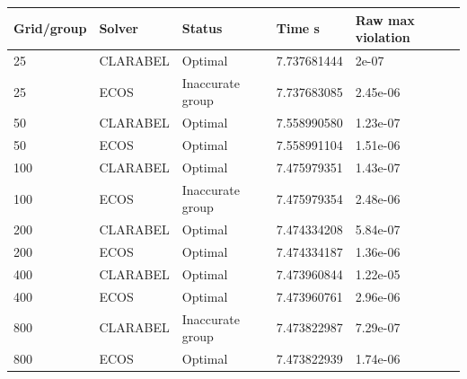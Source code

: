 \begin{tabular}{lllll}
\toprule
Grid/group & Solver & Status & Time s & Raw max violation \\
\midrule
25 & CLARABEL & Optimal & 7.737681444 & 2e-07 \\
25 & ECOS & Inaccurate group & 7.737683085 & 2.45e-06 \\
50 & CLARABEL & Optimal & 7.558990580 & 1.23e-07 \\
50 & ECOS & Optimal & 7.558991104 & 1.51e-06 \\
100 & CLARABEL & Optimal & 7.475979351 & 1.43e-07 \\
100 & ECOS & Inaccurate group & 7.475979354 & 2.48e-06 \\
200 & CLARABEL & Optimal & 7.474334208 & 5.84e-07 \\
200 & ECOS & Optimal & 7.474334187 & 1.36e-06 \\
400 & CLARABEL & Optimal & 7.473960844 & 1.22e-05 \\
400 & ECOS & Optimal & 7.473960761 & 2.96e-06 \\
800 & CLARABEL & Inaccurate group & 7.473822987 & 7.29e-07 \\
800 & ECOS & Optimal & 7.473822939 & 1.74e-06 \\
\bottomrule
\end{tabular}
